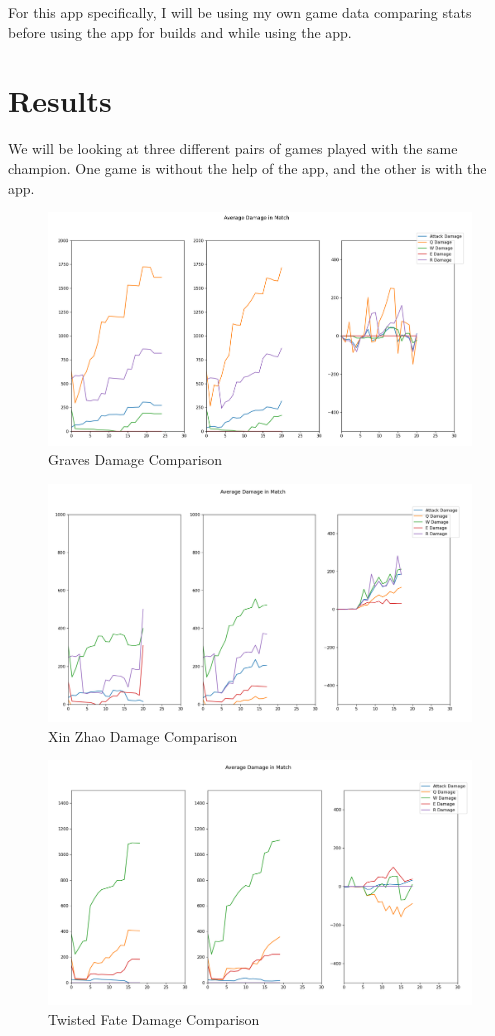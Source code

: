 \documentclass[10pt,twocolumn]{article}
\begin{document}
For this app specifically, I will be using my own game data comparing stats before using the app for builds and while using the app.

\section{Results}
We will be looking at three different pairs of games played with the same champion.
One game is without the help of the app, and the other is with the app.

\begin{figure}
    \includegraphics[width=.95\linewidth]{GravesDamage.PNG}
    \caption{Graves Damage Comparison}
\end{figure}

\begin{figure}
    \includegraphics[width=.95\linewidth]{XinZhaoDamage.PNG}
    \caption{Xin Zhao Damage Comparison}
\end{figure}

\begin{figure}
    \includegraphics[width=.95\linewidth]{TwistedFateDamage.PNG}
    \caption{Twisted Fate Damage Comparison}
\end{figure}
\end{document}

